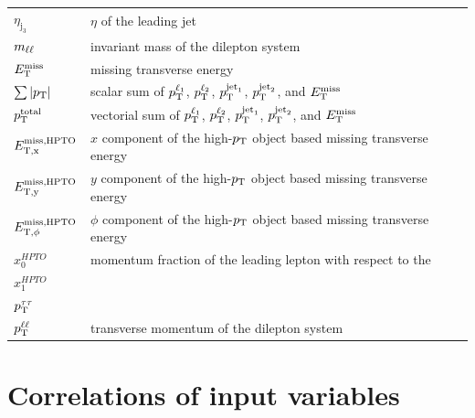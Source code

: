 \begin{longtable}{ll}
    $\eta_{\text{j}_3}$     & $\eta$ of the leading jet \\
    $m_{\ell\ell}$                  & invariant mass of the dilepton system \\
    $E_\text{T}^\text{miss}$               & missing transverse energy \\
    $\sum \left|p_\text{T}\right|$        & scalar sum of $p_\text{T}^{\ell_1}$, $p_\text{T}^{\ell_2}$, $p_\text{T}^{\text{jet}_1}$, $p_\text{T}^{\text{jet}_2}$, and $E_\text{T}^\text{miss}$ \\
    $p_\text{T}^\text{total}$      & vectorial sum of $p_\text{T}^{\ell_1}$, $p_\text{T}^{\ell_2}$, $p_\text{T}^{\text{jet}_1}$, $p_\text{T}^{\text{jet}_2}$, and $E_\text{T}^\text{miss}$\\
    $E_\text{T,x}^\text{miss,HPTO}$          & $x$ component of the high-$p_\text{T}$ object based missing transverse energy \\
    $E_\text{T,y}^\text{miss,HPTO}$          & $y$ component of the high-$p_\text{T}$ object based missing transverse energy \\
    $E_{\text{T},\phi}^\text{miss,HPTO}$        & $\phi$ component of the high-$p_\text{T}$ object based missing transverse energy \\
    $x_0^{HPTO}$            & momentum fraction of the leading lepton with respect to the \\
    $x_1^{HPTO}$            & \\
    $p_\text{T}^{\tau\tau}$        & \\
    $p_\text{T}^{\ell\ell}$        & transverse momentum of the dilepton system \\

\end{longtable}

\section{Correlations of input variables}\label{app:mva:correlation_inputvars}

